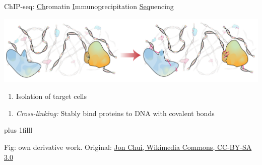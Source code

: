 \documentclass[10pt]{beamer}
\newcommand{\credit}[1]{{\vskip0pt plus 1filll \par \raggedleft \scriptsize \mdseries \color{mDarkBrown} #1 \par}}
\begin{document}
\begin{frame}{ChIP-seq: \underline{Ch}romatin \underline{I}mmuno\underline{p}recipitation \underline{Seq}uencing}
	\vspace{3em}
	\begin{center}
		\includegraphics[width=\textwidth]{./figures/ChIPseq1.png}
	\end{center}
	\begin{minipage}[t]{.49\linewidth}
		\begin{enumerate}
			\item {Isolation of target cells}
		\end{enumerate}
	\end{minipage}
	\begin{minipage}[t]{.49\linewidth}
		\begin{enumerate}
			\item { \textit{Cross-linking:} Stably bind proteins to DNA with covalent bonds}
		\end{enumerate}
	\end{minipage}
	\credit{Fig: own derivative work. Original: \href{http://commons.wikimedia.org/wiki/File:Chromatin\_immunoprecipitation\_sequencing.svg}{Jon Chui, Wikimedia Commons, CC-BY-SA 3.0}}
\end{frame}
\end{document}
